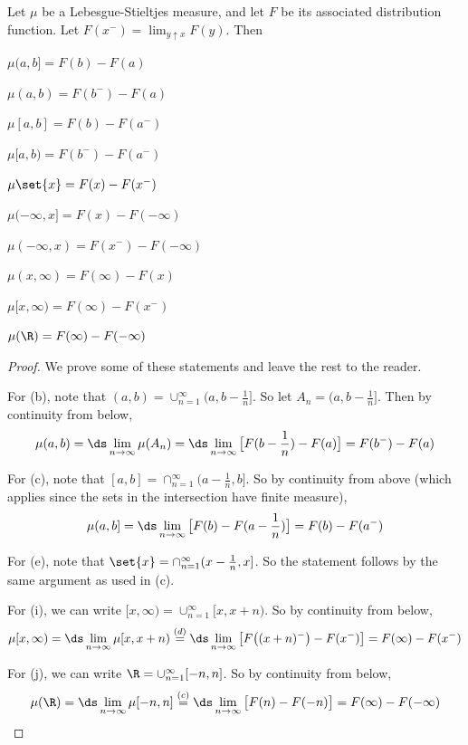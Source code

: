\documentclass{article} %
\newif\ifActive
\begin{document}
 \begin{proposition}
 Let $\mu$ be a Lebesgue-Stieltjes measure, and let $F$ be its associated distribution function.    Let $F(x^-) = \lim_{y \uparrow x} F(y)$. Then 

 \begin{alphabate}
 \item $\mu(a,b] = F(b) - F(a)$	
 \item $\mu(a,b) = F(b^-) - F(a)$	
 \item $\mu[a,b] = F(b) - F(a^-)$	
 \item $\mu[a,b) = F(b^-) - F(a^-)$	
 \item $\mu\set{x} = F(x) - F(x^-)$	
 \item $\mu(-\infty,x] = F(x) - F(-\infty)$	
 \item $\mu(-\infty,x) = F(x^-) - F(-\infty)$	
 \item $\mu(x,\infty) = F(\infty) - F(x)$	
 \item $\mu[x,\infty) = F(\infty) - F(x^-)$	
 \item $\mu(\R) = F(\infty) - F(-\infty)$	
 \end{alphabate}
 \label{prop:properties_of_LS_measures}
\end{proposition}

\begin{proof}
We prove some of these statements and leave the rest to the reader.  

 \ifActive 
\textbf{Workshop Exercise}: Prove part (b)
\else 

For (b), note that $(a,b) = \cup_{n=1}^\infty (a, b-\frac{1}{n}]$.  So let $A_n = (a, b-\frac{1}{n}]$. Then  by continuity from below,
\[\mu(a,b) = \ds\lim_{n \to \infty}  \mu(A_n) = \ds\lim_{n \to \infty} \big[F(b-\frac{1}{n}) - F(a) \big] = F(b^-) - F (a) \]

For (c), note that $[a,b] = \cap_{n=1}^\infty (a-\frac{1}{n}, b]$.   So by continuity from above (which applies since the sets in the intersection have finite measure),
\[\mu(a,b] = \ds\lim_{n \to \infty} \big[F(b) - F(a - \frac{1}{n}) \big] = F(b) - F (a^-) \]

For (e), note that $\set{x} = \cap_{n=1}^\infty (x-\frac{1}{n}, x]$.   So the statement follows by the same argument as used in (c).

For (i), we can write $[x,\infty) = \cup_{n=1}^\infty [x, x+n)$.  So by continuity from below, 
\[\mu[x,\infty) = \ds\lim_{n \to \infty}  \mu[x, x+n) \stackrel{(d)}{=} \ds\lim_{n \to \infty} \big[ F\big( (x+n)^- \big) - F(x^-) \big] = F(\infty) - F(x^-) \]

For (j), we can write $\R = \cup_{n=1}^\infty [-n, n]$.  So by continuity from below, 
\[\mu(\R) = \ds\lim_{n \to \infty}  \mu[-n,n] \stackrel{(c)}{=} \ds\lim_{n \to \infty} \big[ F(n) - F(-n) \big] = F(\infty) - F(-\infty) \]
\fi 
\end{proof}
\end{document}
